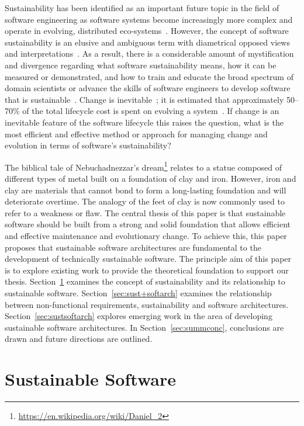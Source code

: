 \documentclass[preprint,12pt,authoryear]{elsarticle}
\begin{document}
Sustainability has been identified as an important future topic in the
field of software engineering as software systems become increasingly
more complex and operate in evolving, distributed
eco-systems~\citep{geist+lucas:2009}. However, the concept of software
sustainability is an elusive and ambiguous term with diametrical
opposed views and interpretations~\citep{venters-et-al:2014}. As a
result, there is a considerable amount of mystification and divergence
regarding what software sustainability means, how it can be measured
or demonstrated, and how to train and educate the broad spectrum of
domain scientists or advance the skills of software engineers to
develop software that is
sustainable~\citep{penzenstadler+fleischmann:2011}.  Change is
inevitable~\citep{bener-et-al:2014}; it is estimated that
approximately 50--70\% of the total lifecycle cost is spent on
evolving a system~\citep{ecklund-et-al:1996}. If change is an
inevitable feature of the software lifecycle this raises the question,
what is the most efficient and effective method or approach for
managing change and evolution in terms of software’s sustainability?

The biblical tale of Nebuchadnezzar's
dream\footnote{\url{https://en.wikipedia.org/wiki/Daniel_2}} relates
to a statue composed of different types of metal built on a foundation
of clay and iron. However, iron and clay are materials that cannot
bond to form a long-lasting foundation and will deteriorate
overtime. The analogy of the feet of clay is now commonly used to
refer to a weakness or flaw. The central thesis of this paper is that
sustainable software should be built from a strong and solid
foundation that allows efficient and effective maintenance and
evolutionary change. To achieve this, this paper proposes that
sustainable software architectures are fundamental to the development
of technically sustainable software. The principle aim of this paper
is to explore existing work to provide the theoretical foundation to
support our thesis. Section~\ref{sec:sussoft} examines the concept of
sustainability and its relationship to sustainable
software. Section~\ref{sec:sust+softarch} examines the relationship
between non-functional requirements, sustainability and software
architectures. Section~\ref{sec:sustsoftarch} explores emerging work
in the area of developing sustainable software architectures. In
Section~\ref{sec:summconc}, conclusions are drawn and future
directions are outlined.


\section{Sustainable Software}\label{sec:sussoft}
\end{document}
